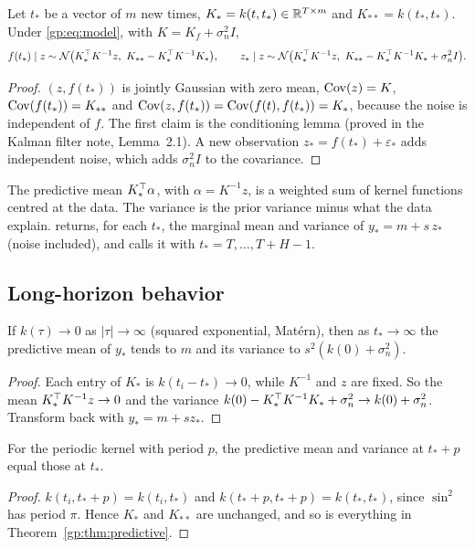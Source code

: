 \begin{theorem}\label{gp:thm:predictive}
Let $t_*$ be a vector of $m$ new times, $K_* = k(t,t_*)\in\mathbb{R}^{T\times m}$ and
$K_{**}=k(t_*,t_*)$. Under \eqref{gp:eq:model}, with $K=K_f+\sigma_n^2I$,
\[
  f(t_*)\mid z\sim\N\big(K_*^\T K^{-1}z,\ K_{**}-K_*^\T K^{-1}K_*\big),\qquad
  z_*\mid z\sim\N\big(K_*^\T K^{-1}z,\ K_{**}-K_*^\T K^{-1}K_*+\sigma_n^2I\big).
\]
\end{theorem}
\begin{proof}
$(z,f(t_*))$ is jointly Gaussian with zero mean, $\operatorname{Cov}(z)=K$, $\operatorname{Cov}(f(t_*))=K_{**}$
and $\operatorname{Cov}(z,f(t_*))=\operatorname{Cov}(f(t),f(t_*))=K_*$, because the noise is independent of $f$. The first claim is the
conditioning lemma (proved in the Kalman filter note, Lemma~2.1). A new observation
$z_*=f(t_*)+\varepsilon_*$ adds independent noise, which adds $\sigma_n^2I$ to the covariance.
\end{proof}

The predictive mean $K_*^\top\alpha$, with $\alpha=K^{-1}z$, is a weighted sum of kernel
functions centred at the data. The variance is the prior variance minus what the
data explain.  returns, for each $t_*$, the
marginal mean and variance of $y_*=m+s\,z_*$ (noise included), and
 calls it with $t_*=T,\dots,T+H-1$.

\subsection{Long-horizon behavior}

\begin{proposition}\label{gp:prop:reversion}
If $k(\tau)\to0$ as $|\tau|\to\infty$ (squared exponential, Matérn), then as
$t_*\to\infty$ the predictive mean of $y_*$ tends to $m$ and its variance to
$s^2(k(0)+\sigma_n^2)$.
\end{proposition}
\begin{proof}
Each entry of $K_*$ is $k(t_i-t_*)\to0$, while $K^{-1}$ and $z$ are fixed. So the mean
$K_*^\top K^{-1}z\to0$ and the variance $k(0)-K_*^\top K^{-1}K_*+\sigma_n^2\to k(0)+\sigma_n^2$.
Transform back with $y_*=m+sz_*$.
\end{proof}

\begin{proposition}\label{gp:prop:periodic}
For the periodic kernel with period $p$, the predictive mean and variance at
$t_*+p$ equal those at $t_*$.
\end{proposition}
\begin{proof}
$k(t_i,t_*+p)=k(t_i,t_*)$ and $k(t_*+p,t_*+p)=k(t_*,t_*)$, since $\sin^2$ has period $\pi$. Hence $K_*$ and
$K_{**}$ are unchanged, and so is everything in Theorem~\ref{gp:thm:predictive}.
\end{proof}

